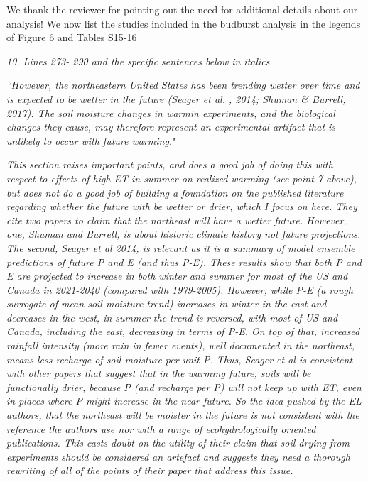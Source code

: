 \documentclass[11pt,a4paper]{letter}
\begin{document}
\par We thank the reviewer for pointing out the need for additional details about our analysis! We now list the studies included in the budburst analysis in the legends of Figure 6 and Tables S15-16
\\
\par \emph{10. Lines 273- 290 and the specific sentences below in italics} 
\par \emph{``However, the northeastern United States has been trending wetter over time and is expected to be wetter in the future (Seager et al. , 2014; Shuman & Burrell, 2017). The soil moisture changes in warmin experiments, and the biological changes they cause, may therefore represent an experimental artifact that is unlikely to occur with future warming.}"
\par \emph{This section raises important points, and does a good job of doing this with respect to effects of high ET in summer on realized warming (see point 7 above), but does not do a good job of building a foundation on the published literature regarding whether the future with be wetter or drier, which I focus on here. They cite two papers to claim that the northeast will have a wetter future. However, one, Shuman and Burrell, is about historic climate history not future projections. The second, Seager et al 2014, is relevant as it is a summary of model ensemble predictions of future P and E (and thus P-E). These results show that both P and E are projected to increase in both winter and summer for most of the US and Canada in 2021-2040 (compared with 1979-2005). However, while P-E (a rough surrogate of mean soil moisture trend) increases in winter in the east and decreases in the west, in summer the trend is reversed, with most of US and Canada, including the east, decreasing in terms of P-E. On top of that, increased rainfall intensity (more rain in fewer events), well documented in the northeast, means less recharge of soil moisture per unit P. Thus, Seager et al is consistent with other papers that suggest that in the warming future, soils will be functionally drier, because P (and recharge per P) will not keep up with ET, even in places where P might increase in the near future. So the idea pushed by the EL authors, that the northeast will be moister in the future is not consistent with the reference the authors use nor with a range of ecohydrologically oriented publications. This casts doubt on the utility of their claim that soil drying from experiments should be considered an artefact and suggests they need a thorough rewriting of all of the points of their paper that address this issue.}
\end{document}

